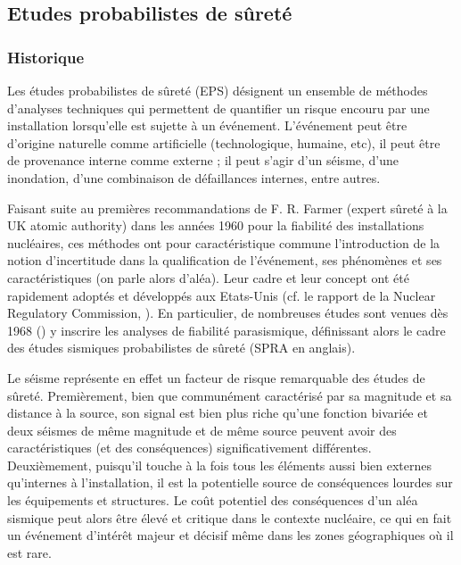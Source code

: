 \subsection{Etudes probabilistes de sûreté}
%

\subsubsection{Historique}

Les études probabilistes de sûreté (EPS) désignent un ensemble de méthodes d'analyses techniques qui permettent de quantifier un risque encouru par une installation lorsqu'elle est sujette à un événement. L'événement peut être d'origine naturelle comme artificielle (technologique, humaine, etc), il peut être de provenance interne comme externe ; il peut s'agir d'un séisme, d'une inondation, d'une combinaison de défaillances internes, entre autres.  %

Faisant suite au premières recommandations de F. R. Farmer (expert sûreté à la UK atomic authority) dans les années 1960 pour la fiabilité des installations nucléaires,
ces méthodes ont pour caractéristique commune l'introduction de la notion d'incertitude dans la qualification de l'événement, ses phénomènes et ses caractéristiques (on parle alors d'aléa).
%
%
Leur cadre et leur concept ont été rapidement adoptés et développés aux Etats-Unis (cf. le rapport de la Nuclear Regulatory Commission, \cite{nrc_pra_1983}). En particulier, de nombreuses études sont venues dès 1968 (\cite{cornell_engineering_1968}) 
y inscrire les analyses de fiabilité parasismique, définissant alors le cadre des études sismiques probabilistes de sûreté (SPRA en anglais). %



Le séisme représente en effet un facteur de risque remarquable des études de sûreté.
Premièrement, bien que communément caractérisé par sa magnitude et sa distance à la source, son signal est bien plus riche qu'une fonction bivariée et deux séismes de même magnitude et de même source peuvent avoir des caractéristiques (et des conséquences) significativement différentes.
Deuxièmement, puisqu'il touche à la fois tous les éléments aussi bien externes qu'internes à l'installation, il est la potentielle source de conséquences lourdes sur les équipements et structures.
Le coût potentiel des conséquences d'un aléa sismique peut alors être élevé et critique dans le contexte nucléaire, ce qui en fait un événement d'intérêt majeur et décisif même dans les zones géographiques où il est rare.


